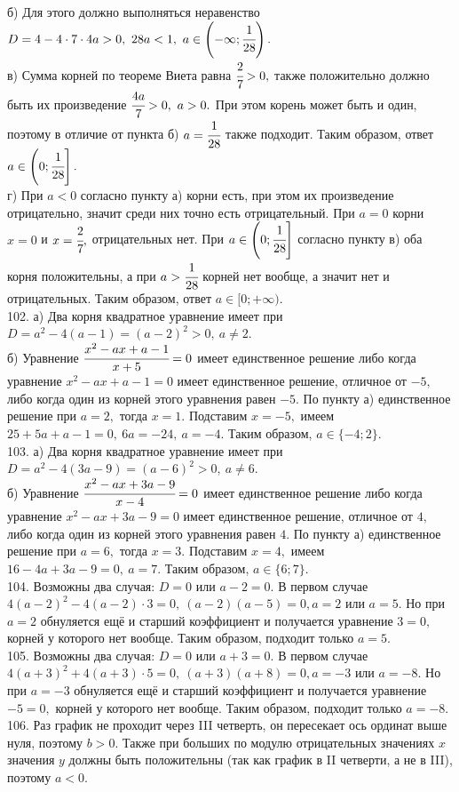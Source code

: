 \documentclass[12pt]{article}
\begin{document}
б) Для этого должно выполняться неравенство $D=4-4\cdot7\cdot4a>0,\ 28a<1,\ a\in\left(-\infty;\cfrac{1}{28}\right).$\\
в) Сумма корней по теореме Виета равна $\cfrac{2}{7}>0,$ также положительно должно быть их произведение $\cfrac{4a}{7}>0,\ a>0.$ При этом корень может быть и один, поэтому в отличие от пункта б) $a=\cfrac{1}{28}$ также подходит. Таким образом, ответ $a\in\left(0;\cfrac{1}{28}\right].$\\
г) При $a<0$ согласно пункту а) корни есть, при этом их произведение отрицательно, значит среди них точно есть отрицательный. При $a=0$ корни $x=0$ и $x=\cfrac{2}{7},$ отрицательных нет. При $a\in\left(0;\cfrac{1}{28}\right]$ согласно пункту в) оба корня положительны, а при $a>\cfrac{1}{28}$ корней нет вообще, а значит нет и отрицательных. Таким образом, ответ $a\in[0;+\infty).$\\
102. а) Два корня квадратное уравнение имеет при $D=a^2-4(a-1)=(a-2)^2>0,\ a\neq2.$\\
б) Уравнение $\cfrac{x^2-ax+a-1}{x+5}=0$ имеет единственное решение либо когда уравнение $x^2-ax+a-1=0$ имеет единственное решение, отличное от $-5,$ либо когда один из корней этого уравнения равен $-5.$ По пункту а) единственное решение при $a=2,$ тогда $x=1.$ Подставим $x=-5,$ имеем $25+5a+a-1=0,\ 6a=-24,\ a=-4.$ Таким образом, $a\in\{-4;2\}.$\\
103. а) Два корня квадратное уравнение имеет при $D=a^2-4(3a-9)=(a-6)^2>0,\ a\neq6.$\\
б) Уравнение $\cfrac{x^2-ax+3a-9}{x-4}=0$ имеет единственное решение либо когда уравнение $x^2-ax+3a-9=0$ имеет единственное решение, отличное от $4,$ либо когда один из корней этого уравнения равен $4.$ По пункту а) единственное решение при $a=6,$ тогда $x=3.$ Подставим $x=4,$ имеем $16-4a+3a-9=0,\ a=7.$ Таким образом, $a\in\{6;7\}.$\\
104. Возможны два случая: $D=0$ или $a-2=0.$ В первом случае $4(a-2)^2-4(a-2)\cdot3=0,\ (a-2)(a-5)=0, a=2$ или $a=5.$ Но при $a=2$ обнуляется ещё и старший коэффициент и получается уравнение $3=0,$ корней у которого нет вообще. Таким образом, подходит только $a=5.$\\
105. Возможны два случая: $D=0$ или $a+3=0.$ В первом случае $4(a+3)^2+4(a+3)\cdot5=0,\ (a+3)(a+8)=0, a=-3$ или $a=-8.$ Но при $a=-3$ обнуляется ещё и старший коэффициент и получается уравнение $-5=0,$ корней у которого нет вообще. Таким образом, подходит только $a=-8.$\\
106. Раз график не проходит через III четверть, он пересекает ось ординат выше нуля, поэтому $b>0.$ Также при больших по модулю отрицательных значениях $x$ значения $y$ должны быть положительны (так как график в II четверти, а не в III), поэтому $a<0.$\\
\end{document}
